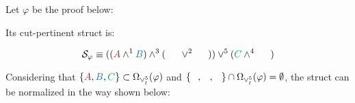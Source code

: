 \begin{example}
\label{example:PlusTimesSwappedDefinitionalNormalization}
Let $\varphi$ be the proof below:

\begin{prooftree}
		 
	 
						 
					 
					 
									 
								 
\end{prooftree}

Its cut-pertinent struct is:

$$
\struct{\varphi} 
\equiv 
((\hA{A} \structplus^1 \hB{B}) \structplus^3 (\hC{\structdual{B}} \structtimes^2 \hD{\structdual{A}}))
\structtimes^5
(\hE{C} \structplus^4 \hF{\structdual{C}})
$$

Considering that $\{ \hA{A}, \hB{B}, \hE{C}\} \subset \occInference{\varphi}{\vee_l^5}$ and $\{ \hD{A}, \hC{B}, \hF{C} \} \cap \occInference{\varphi}{\vee_l^5} = \emptyset$, the struct can be normalized in the way shown below:


\end{example}
